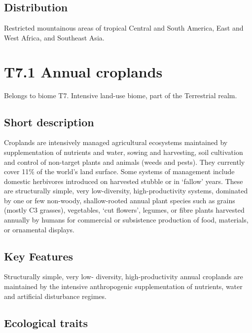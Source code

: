 \documentclass[
  letterpaper,
  DIV=11,
  numbers=noendperiod]{scrartcl}
\begin{document}
\subsection{Distribution}\label{distribution-97}

Restricted mountainous areas of tropical Central and South America, East
and West Africa, and Southeast Asia.

\section{T7.1 Annual croplands}\label{t7.1-annual-croplands}

Belongs to biome T7. Intensive land-use biome, part of the Terrestrial
realm.

\subsection{Short description}\label{short-description-98}

Croplands are intensively managed agricultural ecosystems maintained by
supplementation of nutrients and water, sowing and harvesting, soil
cultivation and control of non-target plants and animals (weeds and
pests). They currently cover 11\% of the world's land surface. Some
systems of management include domestic herbivores introduced on
harvested stubble or in `fallow' years. These are structurally simple,
very low-diversity, high-productivity systems, dominated by one or few
non-woody, shallow-rooted annual plant species such as grains (mostly C3
grasses), vegetables, `cut flowers', legumes, or fibre plants harvested
annually by humans for commercial or subsistence production of food,
materials, or ornamental displays.

\subsection{Key Features}\label{key-features-98}

Structurally simple, very low- diversity, high-productivity annual
croplands are maintained by the intensive anthropogenic supplementation
of nutrients, water and artificial disturbance regimes.

\subsection{Ecological traits}\label{ecological-traits-98}
\end{document}
